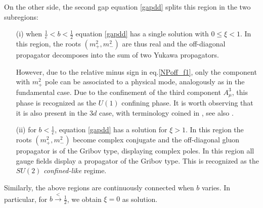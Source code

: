 On the other side, the second gap equation \eqref{gapdd} splits this region in the two subregions:
\begin{itemize}
\item[(i)]  when $\frac{1}{e}<b<\frac{1}{2}$ equation  \eqref{gapdd} has a single solution with $0 \le \xi <1$. In this region, the roots $(m^2_+, m^2_-)$  are thus real and  the off-diagonal propagator decomposes into the sum of two Yukawa propagators.

However, due to the relative minus sign in eq.\eqref{NPoff_f1},  only the component with $m^{2}_+ $ pole can be associated to a physical mode, analogously as in the fundamental case. Due to the confinement of the third component $A^3_\mu$, this phase is recognized as the $U(1)$ confining phase. It is worth observing that it is also present in the $3d$ case, with terminology coined in \cite{Nadkarni:1989na}, see also \cite{Capri:2012cr}.

\item[(ii)]  for $b<\frac{1}{e}$, equation \eqref{gapdd} has a solution for  $\xi>1$. In this
region the roots  $(m^2_+, m^2_-)$  become complex conjugate and the off-diagonal gluon
propagator is of the Gribov type, displaying complex poles.  In this region all gauge fields
display a propagator of the Gribov type. This is recognized as the $SU(2)$ {\it confined-like}
regime.
\end{itemize}
Similarly, the above regions are continuously connected when $b$ varies. In particular, for $b \stackrel{<}{\to} \frac{1}{2}$, we obtain $\xi=0$ as solution.



